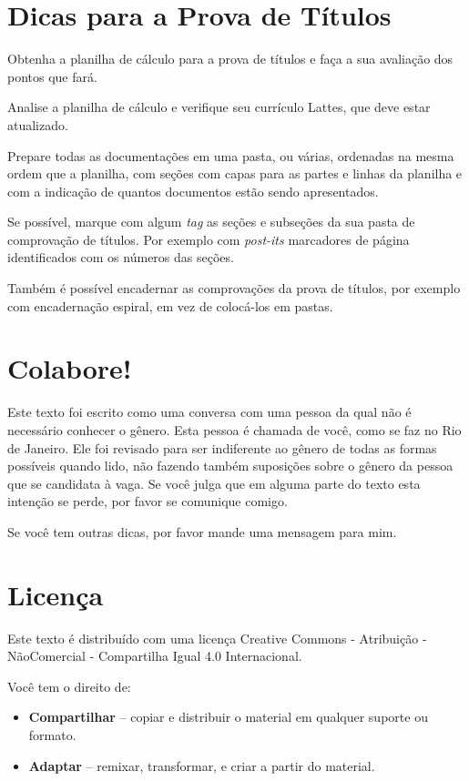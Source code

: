 \documentclass{article}
\begin{document}
\section{Dicas para a Prova de Títulos}

Obtenha a planilha de cálculo para a prova de títulos e faça a sua avaliação dos pontos que fará.

Analise a planilha de cálculo e verifique seu currículo Lattes, que deve estar atualizado.

Prepare todas as documentações em uma pasta, ou várias, ordenadas na mesma ordem que a planilha, com seções com capas para as partes e linhas da planilha e com a indicação de quantos documentos estão sendo apresentados.

Se possível, marque com algum \textit{tag} as seções e subseções da sua pasta de comprovação de títulos.  Por exemplo com \textit{post-its} marcadores de página identificados com os números das seções.

Também é possível encadernar as comprovações da prova de títulos, por exemplo com encadernação espiral, em vez de colocá-los em pastas.

\section{Colabore!}

Este texto foi escrito como uma conversa com uma pessoa da qual não é necessário conhecer o gênero. Esta pessoa é chamada de você, como se faz no Rio de Janeiro. Ele foi revisado para ser indiferente ao gênero de todas as formas possíveis quando lido, não fazendo também suposições sobre o gênero da pessoa que se candidata à vaga. Se você julga que em alguma parte do texto esta intenção se perde, por favor se comunique comigo.

Se você tem outras dicas, por favor mande uma mensagem para mim.

\section{Licença}

Este texto é distribuído com uma licença Creative Commons - Atribuição - NãoComercial - Compartilha Igual 4.0 Internacional.


Você tem o direito de:
\begin{itemize}
\item \textbf{Compartilhar} -- copiar e distribuir o material em qualquer suporte ou formato.
\item \textbf{Adaptar} -- remixar, transformar, e criar a partir do material.
\end{itemize}
\end{document}
